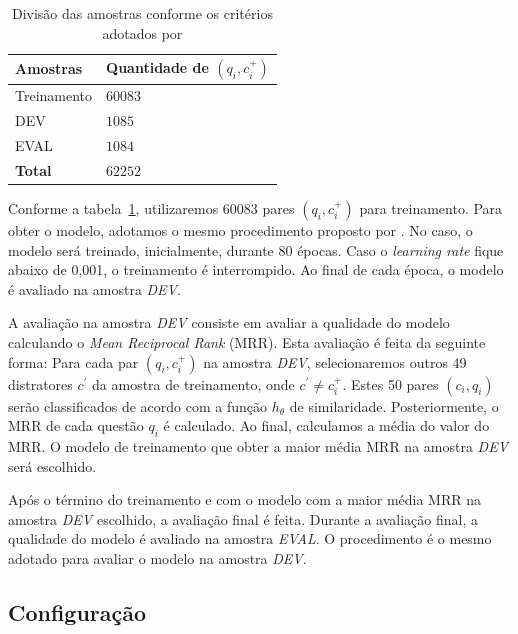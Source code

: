 \documentclass[12pt]{article}
\begin{document}
\begin{table}[h]
\centering
\begin{tabular}{ |p{3cm}|p{3cm}|  }
 \hline
 \textbf{Amostras} & \textbf{Quantidade de $(q_{i}, c_{i}^{+})$}\\
 \hline
 Treinamento & $60083$\\
 \hline
 DEV & $1085$ \\
 \hline
 EVAL & $1084$\\
 \hline
 \textbf{Total} & $62252$\\
 \hline
\end{tabular}
\caption{Divisão das amostras conforme os critérios adotados por \cite{iyer-etal-2016-summarizing}}
\label{table:divisao-amostras}
\end{table}

Conforme a tabela~\ref{table:divisao-amostras}, utilizaremos 60083 pares $(q_{i}, c_{i}^{+})$ para treinamento. Para obter o modelo, adotamos o mesmo procedimento proposto por \cite{iyer-etal-2016-summarizing}. No caso, o modelo será treinado, inicialmente, durante 80 épocas. Caso o \textit{learning rate} fique abaixo de 0,001, o treinamento é interrompido. Ao final de cada época, o modelo é avaliado na amostra \emph{DEV}. 


A avaliação na amostra \emph{DEV} consiste em avaliar a qualidade do modelo calculando o \textit{Mean Reciprocal Rank} (MRR). Esta avaliação é feita da seguinte forma:
 Para cada par $(q_{i}, c_{i}^{+})$ na amostra \emph{DEV}, selecionaremos outros 49 distratores $c^{'}$ da amostra de treinamento, onde $c^{'} \neq c_{i}^{+}$. Estes 50 pares $(c_{i}, q_{i})$ serão classificados de acordo com a função $h_{\theta}$ de similaridade. Posteriormente, o MRR de cada questão $q_{i}$ é calculado. Ao final, calculamos a média do valor do MRR. O modelo de treinamento que obter a maior média MRR na amostra \emph{DEV} será escolhido. 
 
 
 
 Após o término do treinamento e com o modelo com a maior média MRR na amostra \emph{DEV} escolhido, a avaliação final é feita. Durante a avaliação final, a qualidade do modelo é avaliado na amostra \emph{EVAL}. O procedimento é o mesmo adotado para avaliar o modelo na amostra \emph{DEV}.


\subsection{Configuração}
\end{document}
